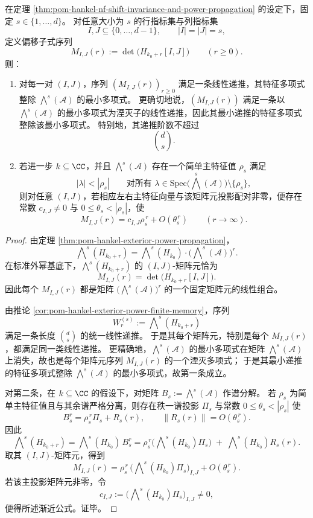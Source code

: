 \begin{theorem}\label{thm:pom-hankel-minor-dynamics-dominant-exterior-spectrum}
在定理 \ref{thm:pom-hankel-nf-shift-invariance-and-power-propagation} 的设定下，固定 \(s\in\{1,\dots,d\}\)。
对任意大小为 \(s\) 的行指标集与列指标集
\[
I,J\subseteq\{0,\dots,d-1\},\qquad |I|=|J|=s,
\]
定义偏移子式序列
\[
M_{I,J}(r):=\det\!\bigl(H_{k_0+r}[I,J]\bigr)\qquad(r\ge 0).
\]
则：
\begin{enumerate}
  \item 对每一对 \((I,J)\)，序列 \((M_{I,J}(r))_{r\ge 0}\) 满足一条线性递推，其特征多项式整除 \(\bigwedge^s(\mathcal A)\) 的最小多项式。
  更确切地说，\((M_{I,J}(r))\) 满足一条以 \(\bigwedge^s(\mathcal A)\) 的最小多项式为湮灭子的线性递推，因此其最小递推的特征多项式整除该最小多项式。
  特别地，其递推阶数不超过
  \[
  \binom{d}{s}.
  \]
  \item 若进一步 \(k\subseteq \CC\)，并且 \(\bigwedge^s(\mathcal A)\) 存在一个简单主特征值 \(\rho_s\) 满足
  \[
  |\lambda|<|\rho_s|
  \qquad
  \text{对所有 } \lambda\in\mathrm{Spec}\!\bigl(\bigwedge^s(\mathcal A)\bigr)\setminus\{\rho_s\},
  \]
  则对任意 \((I,J)\)，若相应左右主特征向量与该矩阵元投影配对非零，便存在常数 \(c_{I,J}\neq 0\) 与 \(0\le \theta_s<|\rho_s|\)，使
  \[
  M_{I,J}(r)=c_{I,J}\rho_s^{\,r}+O(\theta_s^{\,r})
  \qquad(r\to\infty).
  \]
\end{enumerate}
\end{theorem}
\begin{proof}
由定理 \ref{thm:pom-hankel-exterior-power-propagation}，
\[
\bigwedge\nolimits^s(H_{k_0+r})
=
\bigwedge\nolimits^s(H_{k_0})\cdot \bigl(\bigwedge\nolimits^s(\mathcal A)\bigr)^r.
\]
在标准外幂基底下，\(\bigwedge^s(H_{k_0+r})\) 的 \((I,J)\)-矩阵元恰为
\[
M_{I,J}(r)=\det\!\bigl(H_{k_0+r}[I,J]\bigr).
\]
因此每个 \(M_{I,J}(r)\) 都是矩阵 \(\bigl(\bigwedge^s(\mathcal A)\bigr)^r\) 的一个固定矩阵元的线性组合。

由推论 \ref{cor:pom-hankel-exterior-power-finite-memory}，序列
\[
W_r^{(s)}:=\bigwedge\nolimits^s(H_{k_0+r})
\]
满足一条长度 \(\binom{d}{s}\) 的统一线性递推。
于是其每个矩阵元，特别是每个 \(M_{I,J}(r)\)，都满足同一类线性递推。
更精确地，\(\bigwedge^s(\mathcal A)\) 的最小多项式在矩阵 \(\bigwedge^s(\mathcal A)\) 上消失，故也是每个矩阵元序列 \(M_{I,J}(r)\) 的一个湮灭多项式；
于是其最小递推的特征多项式整除 \(\bigwedge^s(\mathcal A)\) 的最小多项式，故第一条成立。

对第二条，在 \(k\subseteq\CC\) 的假设下，对矩阵 \(B_s:=\bigwedge^s(\mathcal A)\) 作谱分解。
若 \(\rho_s\) 为简单主特征值且与其余谱严格分离，则存在秩一谱投影 \(\Pi_s\) 与常数 \(0\le \theta_s<|\rho_s|\) 使
\[
B_s^r=\rho_s^{\,r}\Pi_s+R_s(r),
\qquad
\|R_s(r)\|=O(\theta_s^{\,r}).
\]
因此
\[
\bigwedge\nolimits^s(H_{k_0+r})
=
\bigwedge\nolimits^s(H_{k_0})\,B_s^r
=
\rho_s^{\,r}\bigl(\bigwedge\nolimits^s(H_{k_0})\Pi_s\bigr)
\;+\;
\bigwedge\nolimits^s(H_{k_0})R_s(r).
\]
取其 \((I,J)\)-矩阵元，得到
\[
M_{I,J}(r)
=
\rho_s^{\,r}\,\bigl(\bigwedge\nolimits^s(H_{k_0})\Pi_s\bigr)_{I,J}
+ O(\theta_s^{\,r}).
\]
若该主投影矩阵元非零，令
\[
c_{I,J}:=\bigl(\bigwedge\nolimits^s(H_{k_0})\Pi_s\bigr)_{I,J}\neq 0,
\]
便得所述渐近公式。证毕。
\end{proof}

\endinput
